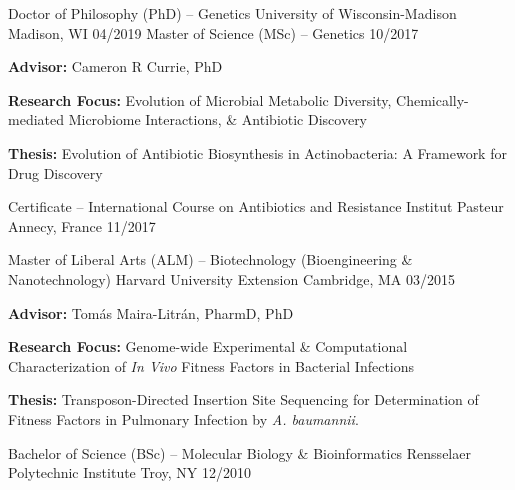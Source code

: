 {}

\begin{cventries}

\cventry
{Doctor of Philosophy (PhD) -- Genetics}
{University of Wisconsin-Madison}
{Madison, WI}
{04/2019}
{}
\vspace{-0.4cm}
\cventry
{Master of Science (MSc) -- Genetics}
{}
{}
{10/2017}
{
\begin{cvitems}
\item {\textbf{Advisor:} Cameron R Currie, PhD}
\item {\textbf{Research Focus:} Evolution of Microbial Metabolic Diversity, Chemically-mediated Microbiome Interactions, \& Antibiotic Discovery}
\item {\textbf{Thesis:} Evolution of Antibiotic Biosynthesis in Actinobacteria: A Framework for Drug Discovery}
\end{cvitems}
}
    
\cventry
{Certificate -- International Course on Antibiotics and Resistance}
{Institut Pasteur}
{Annecy, France}
{11/2017}
{} 

\vspace{-4mm}
    
\cventry
{Master of Liberal Arts (ALM) -- Biotechnology (Bioengineering \& Nanotechnology)}
{Harvard University Extension}
{Cambridge, MA}
{03/2015}
{
\begin{cvitems}
\item {\textbf{Advisor:} Tom\'{a}s Maira-Litr\'{a}n, PharmD, PhD}
\item {\textbf{Research Focus:} Genome-wide Experimental \& Computational Characterization of \textit{In Vivo} Fitness Factors in Bacterial Infections}
\item {\textbf{Thesis:} Transposon-Directed Insertion Site Sequencing for Determination of Fitness Factors in Pulmonary Infection by \textit{A. baumannii}.}
\end{cvitems}
}

\cventry
{Bachelor of Science (BSc) -- Molecular Biology \& Bioinformatics}
{Rensselaer Polytechnic Institute}
{Troy, NY}
{12/2010}
{}

\end{cventries}

\vspace{-7mm}